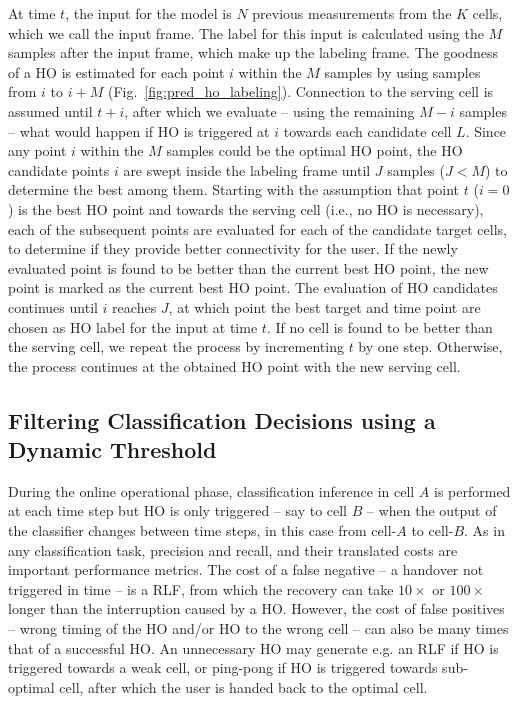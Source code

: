 			At time $t$, the input for the model is $N$ previous measurements from the $K$ cells, which we call the input frame.
			The label for this input is calculated using the $M$ samples after the input frame, which make up the labeling frame.
			The goodness of a \ac{HO} is estimated for each point $i$ within the $M$ samples by using samples from $i$ to $i+M$ (Fig.~\ref{fig:pred_ho_labeling}).
			Connection to the serving cell is assumed until $t+i$, after which we evaluate -- using the remaining $M-i$ samples -- what would happen if \ac{HO} is triggered at $i$ towards each candidate cell $L$.		
			Since any point $i$ within the $M$ samples could be the optimal \ac{HO} point, the \ac{HO} candidate points $i$ are swept inside the labeling frame until $J$ samples ($J<M$) to determine the best among them.
			Starting with the assumption that point $t$ ($i=0$) is the best \ac{HO} point and towards the serving cell (i.e., no \ac{HO} is necessary), each of the subsequent points are evaluated for each of the candidate target cells, to determine if they provide better connectivity for the user.
			If the newly evaluated point is found to be better than the current best \ac{HO} point, the new point is marked as the current best \ac{HO} point.			
			The evaluation of \ac{HO} candidates continues until $i$ reaches $J$, at which point the best target and time point are chosen as \ac{HO} label for the input at time $t$.
			If no cell is found to be better than the serving cell, we repeat the process by incrementing $t$ by one step.
			Otherwise, the process continues at the obtained \ac{HO} point with the new serving cell.		
		
		\subsection{Filtering Classification Decisions using a Dynamic Threshold}
		
			During the online operational phase, classification inference in cell $A$ is performed at each time step but \ac{HO} is only triggered -- say to cell $B$ -- when the output of the classifier changes between time steps, in this case from cell-$A$ to cell-$B$.
			As in any classification task, precision and recall, and their translated costs are important performance metrics.
			The cost of a false negative -- a handover not triggered in time -- is a \ac{RLF}, from which the recovery can take $10\times$ or $100\times$ longer than the interruption caused by a \ac{HO}.
			However, the cost of false positives -- wrong timing of the \ac{HO} and/or \ac{HO} to the wrong cell -- can also be many times that of a successful \ac{HO}.			
			An unnecessary \ac{HO} may generate e.g. an \ac{RLF} if \ac{HO} is triggered towards a weak cell, or ping-pong if \ac{HO} is triggered towards sub-optimal cell, after which the user is handed back to the optimal cell.
			

